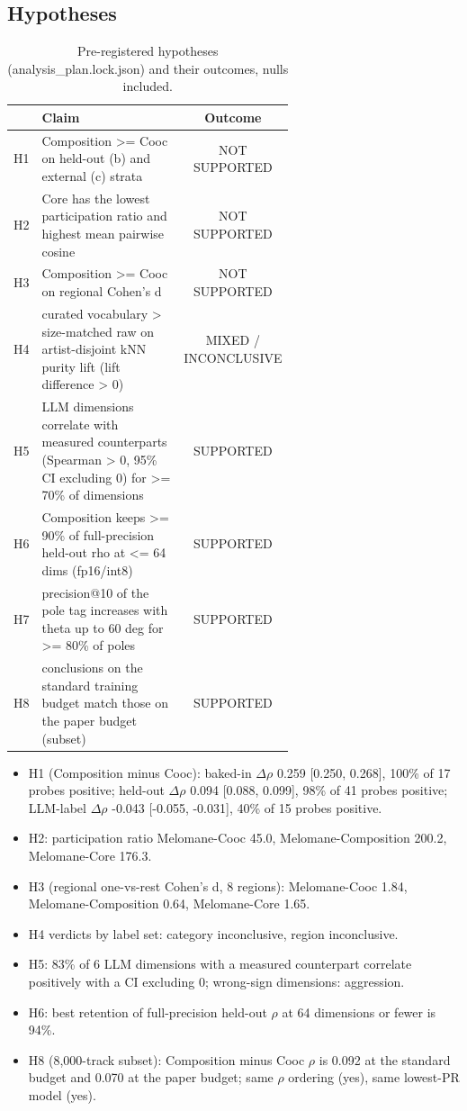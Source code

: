 \documentclass[11pt,a4paper]{article}
\begin{document}
\subsection*{Hypotheses}
\begin{table}[h]\centering\small
\begin{tabular}{lp{0.62\linewidth}c}
\toprule
\textbf{} & \textbf{Claim} & \textbf{Outcome} \\
\midrule
H1 & Composition >= Cooc on held-out (b) and external (c) strata & NOT SUPPORTED \\
H2 & Core has the lowest participation ratio and highest mean pairwise cosine & NOT SUPPORTED \\
H3 & Composition >= Cooc on regional Cohen's d & NOT SUPPORTED \\
H4 & curated vocabulary > size-matched raw on artist-disjoint kNN purity lift (lift difference > 0) & MIXED / INCONCLUSIVE \\
H5 & LLM dimensions correlate with measured counterparts (Spearman > 0, 95\% CI excluding 0) for >= 70\% of dimensions & SUPPORTED \\
H6 & Composition keeps >= 90\% of full-precision held-out rho at <= 64 dims (fp16/int8) & SUPPORTED \\
H7 & precision@10 of the pole tag increases with theta up to 60 deg for >= 80\% of poles & SUPPORTED \\
H8 & conclusions on the standard training budget match those on the paper budget (subset) & SUPPORTED \\
\bottomrule
\end{tabular}
\caption{Pre-registered hypotheses (analysis\_plan.lock.json) and their outcomes, nulls included.}
\end{table}

\begin{itemize}
\item H1 (Composition minus Cooc): baked-in $\Delta$$\rho$ 0.259 [0.250, 0.268], 100\% of 17 probes positive; held-out $\Delta$$\rho$ 0.094 [0.088, 0.099], 98\% of 41 probes positive; LLM-label $\Delta$$\rho$ -0.043 [-0.055, -0.031], 40\% of 15 probes positive.
\item H2: participation ratio Melomane-Cooc 45.0, Melomane-Composition 200.2, Melomane-Core 176.3.
\item H3 (regional one-vs-rest Cohen's d, 8 regions): Melomane-Cooc 1.84, Melomane-Composition 0.64, Melomane-Core 1.65.
\item H4 verdicts by label set: category inconclusive, region inconclusive.
\item H5: 83\% of 6 LLM dimensions with a measured counterpart correlate positively with a CI excluding 0; wrong-sign dimensions: aggression.
\item H6: best retention of full-precision held-out $\rho$ at 64 dimensions or fewer is 94\%.
\item H8 (8,000-track subset): Composition minus Cooc $\rho$ is 0.092 at the standard budget and 0.070 at the paper budget; same $\rho$ ordering (yes), same lowest-PR model (yes).
\end{itemize}
\end{document}
